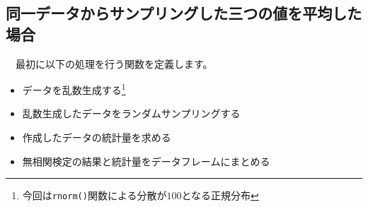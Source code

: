 \documentclass[]{tufte-handout}
\providecommand{\tightlist}{%
  \setlength{\itemsep}{0pt}\setlength{\parskip}{0pt}}
\begin{document}
\newpage

\hypertarget{ux540cux4e00ux30c7ux30fcux30bfux304bux3089ux30b5ux30f3ux30d7ux30eaux30f3ux30b0ux3057ux305fux4e09ux3064ux306eux5024ux3092ux5e73ux5747ux3057ux305fux5834ux5408}{%
\subsection{\texorpdfstring{\textbf{同一データからサンプリングした三つの値を平均した場合}}{同一データからサンプリングした三つの値を平均した場合}}\label{ux540cux4e00ux30c7ux30fcux30bfux304bux3089ux30b5ux30f3ux30d7ux30eaux30f3ux30b0ux3057ux305fux4e09ux3064ux306eux5024ux3092ux5e73ux5747ux3057ux305fux5834ux5408}}

　最初に以下の処理を行う関数を定義します。

\begin{itemize}
\tightlist
\item
  データを乱数生成する\footnote{今回は\texttt{rnorm()}関数による分散が\(100\)となる正規分布}
\item
  乱数生成したデータをランダムサンプリングする
\item
  作成したデータの統計量を求める
\item
  無相関検定の結果と統計量をデータフレームにまとめる
\end{itemize}
\end{document}

